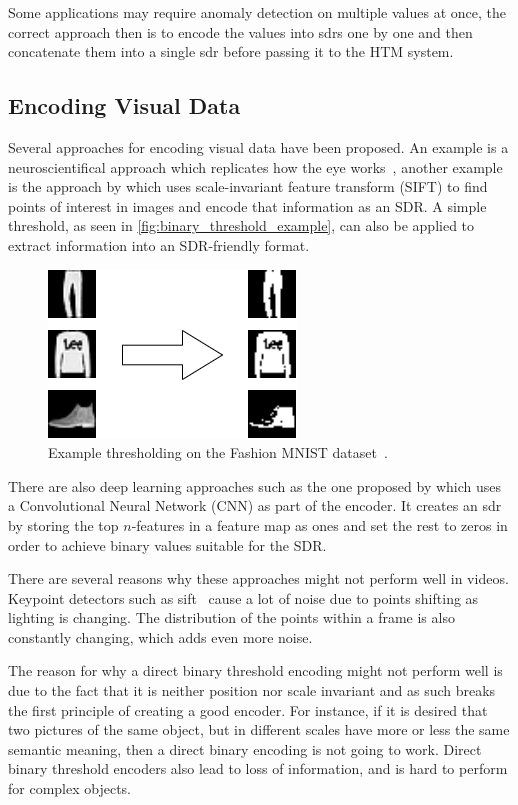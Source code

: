 \par
Some applications may require anomaly detection on multiple values at once, the correct approach then is to encode the values into \glspl*{sdr} one by one and then concatenate them into a single \gls*{sdr} before passing it to the HTM system.
\subsection{Encoding Visual Data}
Several approaches for encoding visual data have been proposed. An example is a neuroscientifical approach which replicates how the eye works~\cite{eyeencoder}, another example is the approach by \textcite{ObjectDetectionSIFT} which uses scale-invariant feature transform (SIFT) to find points of interest in images and encode that information as an SDR. A simple threshold, as seen in \autoref{fig:binary_threshold_example}, can also be applied to extract information into an SDR-friendly format.
\begin{figure}[htb]
    \centering
    \includegraphics[width=0.3\linewidth]{resources/related_works/binary_threshold_example.png}
    \caption[Thresholding Example]{Example thresholding on the Fashion MNIST dataset~\cite{mnist_fashion}.}
    \label{fig:binary_threshold_example}
\end{figure}
\par
There are also deep learning approaches such as the one proposed by \textcite{CNN_HTM} which uses a Convolutional Neural Network (CNN) as part of the encoder. It creates an \gls*{sdr} by storing the top $n$-features in a feature map as ones and set the rest to zeros in order to achieve binary values suitable for the SDR.
\par
There are several reasons why these approaches might not perform well in videos. Keypoint detectors such as \gls*{sift}~\cite{sift} cause a lot of noise due to points shifting as lighting is changing. The distribution of the points within a frame is also constantly changing, which adds even more noise.
\par
The reason for why a direct binary threshold encoding might not perform well is due to the fact that it is neither position nor scale invariant and as such breaks the first principle of creating a good encoder. For instance, if it is desired that two pictures of the same object, but in different scales have more or less the same semantic meaning, then a direct binary encoding is not going to work. Direct binary threshold encoders also lead to loss of information, and is hard to perform for complex objects.
